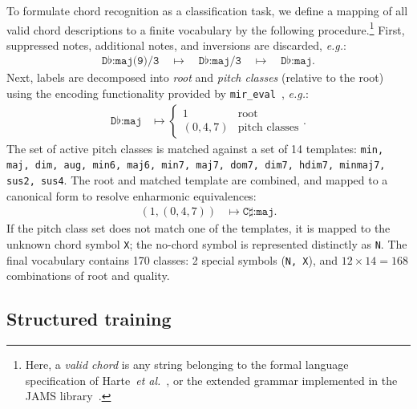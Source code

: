 \documentclass{article}
\def\eg{\emph{e.g.}}
\begin{document}
\label{sec:vocab}
%

To formulate chord recognition as a classification task, we define a mapping of all valid chord descriptions to a finite vocabulary by the following procedure.\footnote{Here, a \emph{valid chord} is any string belonging to the formal language specification of Harte~\emph{et al.}~\cite{harte2005symbolic}, or the extended grammar implemented in the JAMS library~\cite{humphrey2014jams}.}
First, suppressed notes, additional notes, and inversions are discarded, \eg:
\begin{align*}
    \texttt{D}\flat\texttt{:maj(9)/3} 
    \quad\mapsto\quad \texttt{D}\flat\texttt{:maj/3}
    \quad\mapsto\quad \texttt{D}\flat\texttt{:maj}.
\end{align*}
Next, labels are decomposed into \emph{root} and \emph{pitch classes} (relative to the root) using the encoding functionality provided by \texttt{mir\_eval}~\cite{raffel2014mir_eval}, \eg:
\begin{align*}
    \texttt{D}\flat\texttt{:maj} &\mapsto \begin{cases}
        1 & \text{root}\\
        (0, 4, 7) & \text{pitch classes}
    \end{cases}.
\end{align*}
The set of active pitch classes is matched against a set of 14 templates: \texttt{min, maj, dim, aug, min6, maj6, min7, maj7, dom7, dim7, hdim7, minmaj7, sus2, sus4}.
The root and matched template are combined, and mapped to a canonical form to resolve enharmonic equivalences:
\begin{align*}
    \left(1, (0, 4, 7) \right) &\mapsto \texttt{C}\sharp\texttt{:maj}.
\end{align*}
If the pitch class set does not match one of the templates, it is mapped to the unknown chord symbol \texttt{X}; the no-chord symbol is represented distinctly as \texttt{N}.
The final vocabulary contains 170 classes: 2 special symbols (\texttt{N, X}), and $12\times14=168$ combinations of root and quality.


\subsection{Structured training}
\label{sec:encoding}
\end{document}
